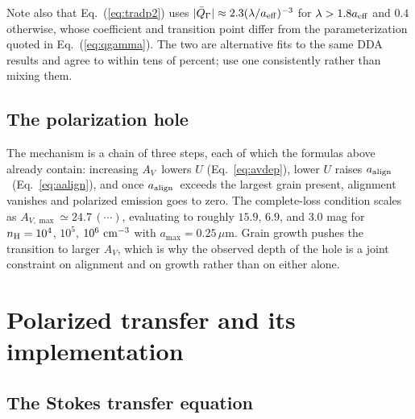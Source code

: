 \documentclass{my_memo}
\newcommand{\um}{\ensuremath{\,\mu\mathrm{m}}}
\newcommand{\aalign}{\ensuremath{a_{\rm align}}}
\newcommand{\Av}{\ensuremath{A_V}}
\begin{document}
Note also that Eq.~(\ref{eq:tradp2}) uses
$|\bar Q_\Gamma| \approx 2.3(\lambda/a_{\rm eff})^{-3}$ for
$\lambda > 1.8 a_{\rm eff}$ and $0.4$ otherwise, whose coefficient and
transition point differ from the parameterization quoted in
Eq.~(\ref{eq:qgamma}). The two are alternative fits to the same DDA results
and agree to within tens of percent; use one consistently rather than mixing
them.

\subsection{The polarization hole}

The mechanism is a chain of three steps, each of which the formulas above
already contain: increasing \Av\ lowers $U$ (Eq.~\ref{eq:avdep}), lower
$U$ raises \aalign\ (Eq.~\ref{eq:aalign}), and once \aalign\ exceeds the
largest grain present, alignment vanishes and polarized emission goes to
zero. The complete-loss condition scales as
$A_{V,\max} \simeq 24.7\,(\cdots)$, evaluating to roughly $15.9$, $6.9$,
and $3.0$ mag for $n_{\rm H} = 10^4$, $10^5$, $10^6\ {\rm cm}^{-3}$ with
$a_{\max} = 0.25$\um. Grain growth pushes the transition to larger \Av,
which is why the observed depth of the hole is a joint constraint on
alignment and on growth rather than on either alone.

\section{Polarized transfer and its implementation}
\label{sec:rt}

\subsection{The Stokes transfer equation}
\end{document}
